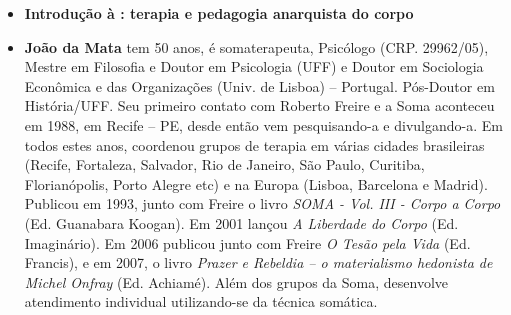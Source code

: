 \begin{itemize}
\item \textbf{Introdução à : terapia e pedagogia anarquista do corpo} \lipsum[1]
  
\item \textbf{João da Mata} tem 50 anos, é somaterapeuta, Psicólogo (CRP. 29962/05), Mestre em Filosofia e Doutor em Psicologia (UFF) e Doutor em Sociologia Econômica e das Organizações (Univ. de Lisboa) -- Portugal. Pós-Doutor em História/UFF.
Seu primeiro contato com Roberto Freire e a Soma aconteceu em 1988, em Recife -- PE, desde então vem pesquisando-a e divulgando-a. Em todos estes anos, coordenou grupos de terapia em várias cidades brasileiras
(Recife, Fortaleza, Salvador, Rio de Janeiro, São Paulo, Curitiba, Florianópolis, Porto Alegre etc) e na Europa (Lisboa, Barcelona e Madrid).
Publicou em 1993, junto com Freire o livro \emph{SOMA - Vol. III - Corpo a Corpo} (Ed. Guanabara Koogan). Em 2001 lançou \emph{A Liberdade do Corpo} (Ed. Imaginário). Em 2006 publicou junto com Freire \emph{O Tesão pela Vida} (Ed. Francis), e em 2007, o livro \emph{Prazer e Rebeldia -- o materialismo hedonista de Michel Onfray} (Ed. Achiamé).
Além dos grupos da Soma, desenvolve atendimento individual utilizando-se da técnica somática.

\end{itemize}

